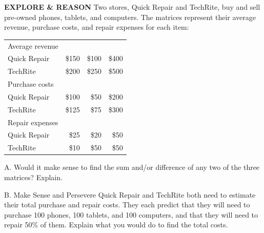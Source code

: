 \documentclass{article}
\newenvironment{model-discuss}{}{}      %
\newcommand{\answer}[1]{}               %
\newcommand{\placeholder}[2]{}          %
\newcommand{\te}[1]{}                   %
\begin{document}
\begin{model-discuss}
\textbf{EXPLORE \& REASON}
Two stores, Quick Repair and TechRite, buy and sell pre-owned phones, tablets, and computers. The matrices represent their average revenue, purchase costs, and repair expenses for each item:
\placeholder{illustration}{Phone, tablet, and desktop computer pictured from left to right above the three matrix columns, on pale blue background.}
\begin{tabular}{lrrr}
Average revenue & & & \\
Quick Repair & \$150 & \$100 & \$400 \\
TechRite & \$200 & \$250 & \$500 \\
Purchase costs & & & \\
Quick Repair & \$100 & \$50 & \$200 \\
TechRite & \$125 & \$75 & \$300 \\
Repair expenses & & & \\
Quick Repair & \$25 & \$20 & \$50 \\
TechRite & \$10 & \$50 & \$50 \\
\end{tabular}
A. Would it make sense to find the sum and/or difference of any two of the three matrices? Explain.
\answer{Yes; the sum of the purchase costs and repair expenses matrices would find the total cost of purchasing and repairing a device.}
B. Make Sense and Persevere Quick Repair and TechRite both need to estimate their total purchase and repair costs. They each predict that they will need to purchase 100 phones, 100 tablets, and 100 computers, and that they will need to repair 50\% of them. Explain what you would do to find the total costs.
\answer{Multiply the purchase costs matrix by a scalar of 100 since each store is buying 100 of each item. This would give the total purchase costs. Then multiply the repair expenses matrix by a scalar of 50 since they predict they will need to repair 50 of each item, which would give the total repair costs. Finally, I would add the two resulting matrices to find the total costs}
\te{Digital preview repeats the same prompt and data, with two boxes labeled "Enter your answer." and a Go back control.}
\placeholder{illustration}{Digital Explore and Reason preview: identical Quick Repair and TechRite revenue, purchase, and repair matrices; phone/tablet/computer illustration; prompts A and B at left with empty Enter your answer boxes, Go back at top.}
\end{model-discuss}
\end{document}
